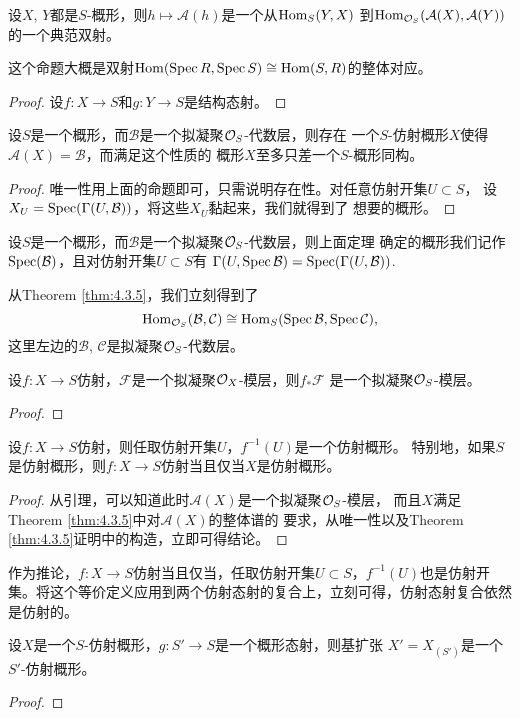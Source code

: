 \begin{pro}
设$X$, $Y$都是$S$-概形，则$h\mapsto \mathcal A(h)$是一个从$\operatorname{Hom}_S(Y,X)$
到$\operatorname{Hom}_{\mathcal{O}_S}(\mathcal A(X),\mathcal A(Y))$的一个典范双射。
\end{pro}

这个命题大概是双射$\operatorname{Hom}(\operatorname{Spec} R,\operatorname{Spec} S)\cong \operatorname{Hom}(S,R)$的整体对应。

\begin{proof}
设$f:X\to S$和$g:Y\to S$是结构态射。\notprove
\end{proof}

\begin{thm}\label{thm:4.3.5}
设$S$是一个概形，而$\mathcal B$是一个拟凝聚$\mathcal{O}_S$-代数层，则存在
一个$S$-仿射概形$X$使得$\mathcal A(X)=\mathcal B$，而满足这个性质的
概形$X$至多只差一个$S$-概形同构。
\end{thm}

\begin{proof}
唯一性用上面的命题即可，只需说明存在性。对任意仿射开集$U\subset S$，
设$X_U=\operatorname{Spec}(\Gamma(U,\mathcal B))$，将这些$X_U$黏起来，我们就得到了
想要的概形。\notprove
\end{proof}

\begin{para}[整体谱]
设$S$是一个概形，而$\mathcal B$是一个拟凝聚$\mathcal{O}_S$-代数层，则上面定理
确定的概形我们记作$\operatorname{Spec} (\mathcal B)$，且对仿射开集$U\subset S$有
$\Gamma(U,\operatorname{Spec} \mathcal B)=\operatorname{Spec} (\Gamma(U,\mathcal B))$. 
\end{para}

从Theorem \ref{thm:4.3.5}，我们立刻得到了
\[
	\operatorname{Hom}_{\mathcal{O}_S}(\mathcal B,\mathcal C)\cong 
	\operatorname{Hom}_S(\operatorname{Spec}\mathcal B,\operatorname{Spec}\mathcal C),
\]
这里左边的$\mathcal B$, $\mathcal C$是拟凝聚$\mathcal{O}_S$-代数层。

\begin{lem}
设$f:X\to S$仿射，$\mathcal F$是一个拟凝聚$\mathcal{O}_X$-模层，则$f_*\mathcal F$
是一个拟凝聚$\mathcal{O}_S$-模层。
\end{lem}

\begin{proof}
\notprove
\end{proof}

\begin{pro}
设$f:X\to S$仿射，则任取仿射开集$U$，$f^{-1}(U)$是一个仿射概形。
特别地，如果$S$是仿射概形，则$f:X\to S$仿射当且仅当$X$是仿射概形。
\end{pro}

\begin{proof}
从引理，可以知道此时$\mathcal A(X)$是一个拟凝聚$\mathcal{O}_S$-模层，
而且$X$满足Theorem \ref{thm:4.3.5}中对$\mathcal A(X)$的整体谱的
要求，从唯一性以及Theorem \ref{thm:4.3.5}证明中的构造，立即可得结论。
\end{proof}

作为推论，$f:X\to S$仿射当且仅当，任取仿射开集$U\subset S$，$f^{-1}(U)$也是仿射开集。将这个等价定义应用到两个仿射态射的复合上，立刻可得，仿射态射复合依然是仿射的。

\begin{pro}
设$X$是一个$S$-仿射概形，$g:S'\to S$是一个概形态射，则基扩张
$X'=X_{(S')}$是一个$S'$-仿射概形。
\end{pro}

\begin{proof}
\notprove
\end{proof}